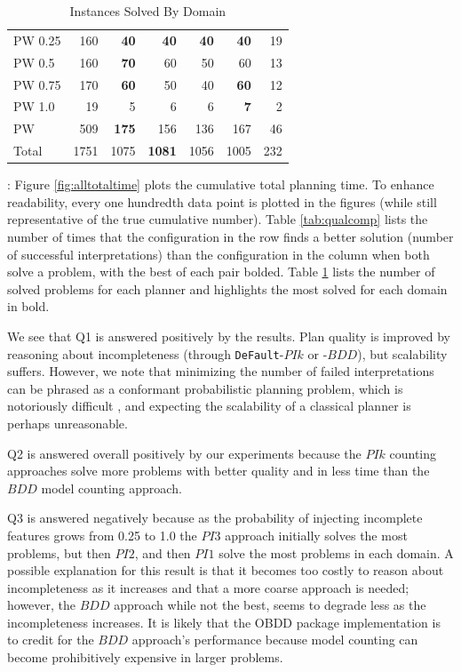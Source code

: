 \documentclass[letterpaper]{article}
\def\und#1{\noindent{\bf #1}:}
\def\default{{\tt DeFault}}
\def\citep#1{\cite{#1}}
\begin{document}
\begin{table}[t]
\begin{tabular}{|l|r|r@{ }r@{ }r@{ }r|r|}
PW 0.25 	&		160		&	{\bf	40}	&	{\bf	40}	&	{\bf	40}	&	{\bf	40}	&	19	\\	
PW 0.5 	&		160		&	{\bf	70}	&		60		&		50		&		60		&	13	\\	
PW 0.75 	&		170		&	{\bf	60}	&		50		&		40		&	{\bf	60}	&	12	\\	
PW 1.0 	&		19		&		5		&		6		&		6		&	{\bf	7}	&	2	\\	\hline
PW 	&		509		&	{\bf	175}	&		156		&		136		&		167		&	46	\\	\hline\hline
Total	&		1751		&		1075		&	{\bf	1081}	&		1056		&		1005		&	232	\\	
\hline																								
\end{tabular}	\caption{\label{tab:solved} Instances Solved By Domain}																							
\end{table}																																												



\und{Off-line Planning Results} Figure \ref{fig:alltotaltime} plots the
 cumulative total planning time.  To enhance readability, every one
hundredth data point is plotted in the figures (while still representative of
the true cumulative number).  Table \ref{tab:qualcomp} lists the number of times
that the configuration in the row finds a better solution (number of successful
interpretations) than the configuration in the column when both solve a problem,
with the best of each pair bolded. Table \ref{tab:solved} lists the number of solved problems for each planner and
highlights the most solved for each domain in bold.

We see that Q1 is answered positively by the results.  Plan quality is
improved by reasoning about incompleteness (through \default{}-$PIk$ or -$BDD$),
but scalability suffers.  However, we note that minimizing the number of failed
interpretations  can be phrased as a conformant probabilistic
planning problem, which is notoriously difficult \citep{pff,aij-mclug}, and
expecting the scalability of a classical planner is perhaps  unreasonable.

Q2 is answered overall positively by our experiments because the $PIk$ counting
approaches solve more problems with better quality and in less time than the
$BDD$ model counting approach.  

Q3 is answered negatively because as the probability of injecting incomplete
features grows from 0.25 to 1.0 the $PI3$ approach initially solves the most
problems, but then $PI2$, and then $PI1$ solve the most problems in each domain.
A possible explanation for this result is that it becomes too costly to reason
about incompleteness as it increases and that a more coarse approach is needed;
however, the $BDD$ approach while not the best, seems to degrade less as the
incompleteness increases.  It is likely that the OBDD package 
implementation \citep{jdd} is to credit for the $BDD$ approach's performance
because model counting can become prohibitively expensive in larger problems.
\end{document}
